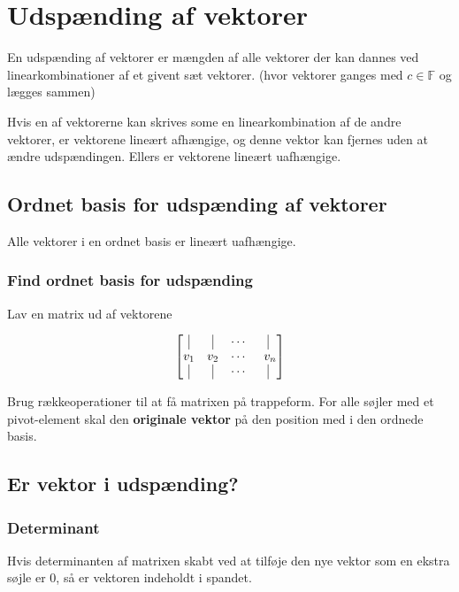 \section{Udspænding af vektorer}
En udspænding af vektorer er mængden af alle vektorer der kan dannes ved linearkombinationer af et givent sæt vektorer. (hvor vektorer ganges med $c \in \mathbb{F}$ og lægges sammen)

Hvis en af vektorerne kan skrives some en linearkombination af de andre vektorer, er vektorene lineært afhængige, og denne vektor kan fjernes uden at ændre udspændingen. Ellers er vektorene lineært uafhængige.

\subsection{Ordnet basis for udspænding af vektorer}
Alle vektorer i en ordnet basis er lineært uafhængige. 

\label{sec:ordnet-basis-udspaending}
\subsubsection{Find ordnet basis for udspænding}
Lav en matrix ud af vektorene

\[
    \begin{bmatrix}
        \vline & \vline & \cdots & \vline \\
        v_1 & v_2 & \cdots & \ v_n \\
        \vline & \vline & \cdots & \vline \\

    \end{bmatrix}
\]

Brug rækkeoperationer til at få matrixen på trappeform. 
For alle søjler med et pivot-element skal den \textbf{originale vektor} på den position med i den ordnede basis.


\subsection{Er vektor i udspænding?}
\label{sec:span}

\subsubsection{Determinant}
Hvis determinanten af matrixen skabt ved at tilføje den nye vektor som en ekstra søjle er 0, så er vektoren indeholdt i spandet.


